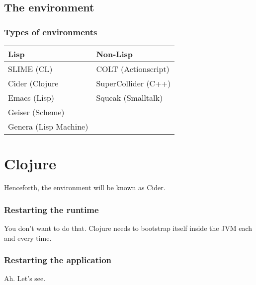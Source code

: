 \documentclass[11pt]{article}
\begin{document}
\subsection*{The environment}
\label{sec:orgheadline17}
\subsubsection*{Types of environments}
\label{sec:orgheadline16}
\begin{center}
\begin{tabular}{ll}
Lisp & Non-Lisp\\
\hline
SLIME  (CL) & COLT (Actionscript)\\
Cider (Clojure & SuperCollider (C++)\\
Emacs (Lisp) & Squeak (Smalltalk)\\
Geiser (Scheme) & \\
Genera (Lisp Machine) & \\
\end{tabular}
\end{center}
\section*{Clojure}
\label{sec:orgheadline32}
Henceforth, the environment will be known as Cider.
\subsubsection*{Restarting the runtime}
\label{sec:orgheadline19}
You don’t want to do that. 
Clojure needs to bootstrap itself inside the JVM each and every time.
\subsubsection*{Restarting the application}
\label{sec:orgheadline20}
Ah. Let’s see.
\end{document}
